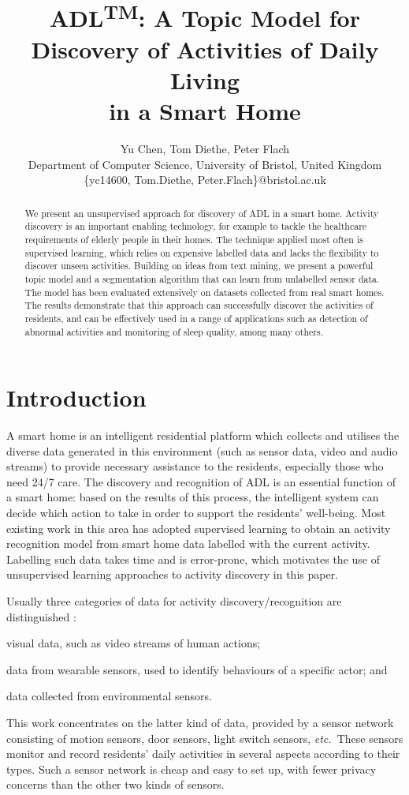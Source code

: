 \documentclass{article}
\title{ADL\textsuperscript{TM}: A Topic Model for Discovery of Activities of Daily Living \\ in a Smart Home}
\author{Yu Chen, Tom Diethe, Peter Flach \\
 Department of Computer Science, University of Bristol, United Kingdom \\
 \{yc14600, Tom.Diethe, Peter.Flach\}@bristol.ac.uk}
\newcommand{\etc}{{\em etc.~\/}}
\begin{document}
\maketitle

\begin{abstract}
We present an unsupervised approach for discovery of \acf{ADL} in a smart home. Activity discovery is an important enabling technology, for example to tackle the healthcare requirements of elderly people in their homes. The technique applied most often is supervised learning, which relies on expensive labelled data and lacks the flexibility to discover unseen activities. Building on ideas from text mining, we present a powerful topic model and a segmentation algorithm that can learn from unlabelled sensor data. The model has been evaluated extensively on datasets collected from real smart homes. The results demonstrate that this approach can successfully discover the activities of residents, and can be effectively used in a range of applications such as detection of abnormal activities and monitoring of sleep quality, among many others.
 
\end{abstract}

%
\section{Introduction}
A smart home is an intelligent residential platform which collects and utilises the diverse data generated in this environment (such as sensor data, video and audio streams) to provide necessary assistance to the residents, especially those who need 24/7 care. The discovery and recognition of \acf{ADL} is an essential function of a smart home: based on the results of this process, the intelligent system can decide which action to take in order to support the residents' well-being. Most existing work in this area has adopted supervised learning to obtain an activity recognition model from smart home data labelled with the current activity. Labelling such data takes time and is error-prone, which motivates the use of unsupervised learning approaches to activity discovery in this paper.

Usually three categories of data for activity discovery/recognition are distinguished \cite{chen2012sensor}: 
\begin{enumerate*}[label=(\roman*)]
\item visual data, such as video streams of human actions; 
\item data from wearable sensors, used to identify behaviours of a specific actor; and
\item data collected from environmental sensors. 
\end{enumerate*}
This work concentrates on the latter kind of data, provided by a sensor network consisting of motion sensors, door sensors, light switch sensors, \etc These sensors monitor and record residents' daily activities in several aspects according to their types. Such a sensor network is cheap and easy to set up, with fewer privacy concerns than the other two kinds of sensors. 
\end{document}
